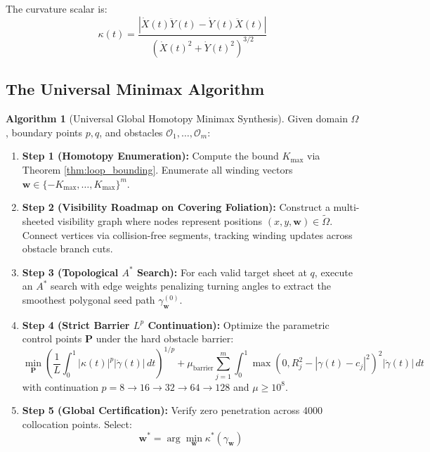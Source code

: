 \documentclass[11pt,reqno]{amsart}
\theoremstyle{definition}
\newtheorem{algorithm}[theorem]{Algorithm}
\newcommand{\Cover}{\widetilde{\Omega}}
\numberwithin{equation}{section}
\begin{document}
The curvature scalar is:
\begin{equation}
\kappa(t) = \frac{|\dot{X}(t)\ddot{Y}(t) - \dot{Y}(t)\ddot{X}(t)|}{\left(\dot{X}(t)^2 + \dot{Y}(t)^2\right)^{3/2}}
\end{equation}

\subsection{The Universal Minimax Algorithm}
\begin{algorithm}[Universal Global Homotopy Minimax Synthesis]
\label{alg:universal_minimax}
Given domain $\Omega$, boundary points $p, q$, and obstacles $\mathcal{O}_1, \dots, \mathcal{O}_m$:
\begin{enumerate}
    \item \textbf{Step 1 (Homotopy Enumeration):} Compute the bound $K_{\max}$ via Theorem \ref{thm:loop_bounding}. Enumerate all winding vectors $\mathbf{w} \in \{-K_{\max}, \dots, K_{\max}\}^m$.
    \item \textbf{Step 2 (Visibility Roadmap on Covering Foliation):} Construct a multi-sheeted visibility graph where nodes represent positions $(x, y, \mathbf{w}) \in \Cover$. Connect vertices via collision-free segments, tracking winding updates across obstacle branch cuts.
    \item \textbf{Step 3 (Topological $A^*$ Search):} For each valid target sheet at $q$, execute an $A^*$ search with edge weights penalizing turning angles to extract the smoothest polygonal seed path $\gamma_{\mathbf{w}}^{(0)}$.
    \item \textbf{Step 4 (Strict Barrier $L^p$ Continuation):} Optimize the parametric control points $\mathbf{P}$ under the hard obstacle barrier:
    \begin{equation}
    \min_{\mathbf{P}} \left( \frac{1}{L} \int_0^1 |\kappa(t)|^p |\dot{\gamma}(t)|\,dt \right)^{1/p} + \mu_{\mathrm{barrier}} \sum_{j=1}^m \int_0^1 \max(0, R_j^2 - |\gamma(t) - c_j|^2)^2 |\dot{\gamma}(t)| \, dt
    \end{equation}
    with continuation $p = 8 \to 16 \to 32 \to 64 \to 128$ and $\mu \ge 10^8$.
    \item \textbf{Step 5 (Global Certification):} Verify zero penetration across 4000 collocation points. Select:
    \begin{equation}
    \mathbf{w}^* = \arg\min_{\mathbf{w}} \kappa^*(\gamma_{\mathbf{w}})
    \end{equation}
\end{enumerate}
\end{algorithm}
\end{document}
